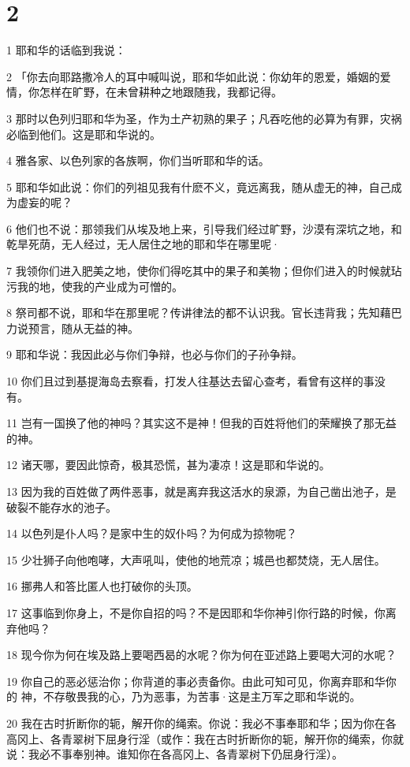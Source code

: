 \chapter{2}

\par 1 耶和华的话临到我说：
\par 2 「你去向耶路撒冷人的耳中喊叫说，耶和华如此说：你幼年的恩爱，婚姻的爱情，你怎样在旷野，在未曾耕种之地跟随我，我都记得。
\par 3 那时以色列归耶和华为圣，作为土产初熟的果子；凡吞吃他的必算为有罪，灾祸必临到他们。这是耶和华说的。
\par 4 雅各家、以色列家的各族啊，你们当听耶和华的话。
\par 5 耶和华如此说：你们的列祖见我有什麽不义，竟远离我，随从虚无的神，自己成为虚妄的呢？
\par 6 他们也不说：那领我们从埃及地上来，引导我们经过旷野，沙漠有深坑之地，和乾旱死荫，无人经过，无人居住之地的耶和华在哪里呢·
\par 7 我领你们进入肥美之地，使你们得吃其中的果子和美物；但你们进入的时候就玷污我的地，使我的产业成为可憎的。
\par 8 祭司都不说，耶和华在那里呢？传讲律法的都不认识我。官长违背我；先知藉巴力说预言，随从无益的神。
\par 9 耶和华说：我因此必与你们争辩，也必与你们的子孙争辩。
\par 10 你们且过到基提海岛去察看，打发人往基达去留心查考，看曾有这样的事没有。
\par 11 岂有一国换了他的神吗？其实这不是神！但我的百姓将他们的荣耀换了那无益的神。
\par 12 诸天哪，要因此惊奇，极其恐慌，甚为凄凉！这是耶和华说的。
\par 13 因为我的百姓做了两件恶事，就是离弃我这活水的泉源，为自己凿出池子，是破裂不能存水的池子。
\par 14 以色列是仆人吗？是家中生的奴仆吗？为何成为掠物呢？
\par 15 少壮狮子向他咆哮，大声吼叫，使他的地荒凉；城邑也都焚烧，无人居住。
\par 16 挪弗人和答比匿人也打破你的头顶。
\par 17 这事临到你身上，不是你自招的吗？不是因耶和华你神引你行路的时候，你离弃他吗？
\par 18 现今你为何在埃及路上要喝西曷的水呢？你为何在亚述路上要喝大河的水呢？
\par 19 你自己的恶必惩治你；你背道的事必责备你。由此可知可见，你离弃耶和华你的 神，不存敬畏我的心，乃为恶事，为苦事·这是主万军之耶和华说的。
\par 20 我在古时折断你的轭，解开你的绳索。你说：我必不事奉耶和华；因为你在各高冈上、各青翠树下屈身行淫（或作：我在古时折断你的轭，解开你的绳索，你就说：我必不事奉别神。谁知你在各高冈上、各青翠树下仍屈身行淫）。

